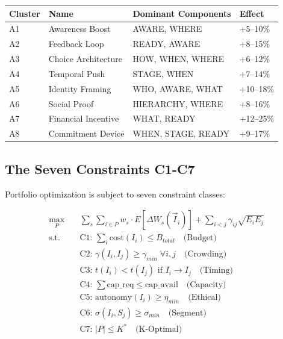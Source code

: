 \begin{center}
\renewcommand{\arraystretch}{1.1}
\small
\begin{tabular}{@{}llll@{}}
\toprule
\textbf{Cluster} & \textbf{Name} & \textbf{Dominant Components} & \textbf{Effect} \\
\midrule
A1 & Awareness Boost & AWARE, WHERE & +5--10\% \\
A2 & Feedback Loop & READY, AWARE & +8--15\% \\
A3 & Choice Architecture & HOW, WHEN, WHERE & +6--12\% \\
A4 & Temporal Push & STAGE, WHEN & +7--14\% \\
A5 & Identity Framing & WHO, AWARE, WHAT & +10--18\% \\
A6 & Social Proof & HIERARCHY, WHERE & +8--16\% \\
A7 & Financial Incentive & WHAT, READY & +12--25\% \\
A8 & Commitment Device & WHEN, STAGE, READY & +9--17\% \\
\bottomrule
\end{tabular}
\end{center}

\subsection{The Seven Constraints C1-C7}

Portfolio optimization is subject to seven constraint classes:

\begin{equation}
\boxed{
\begin{aligned}
\max_{P} \quad & \sum_{s} \sum_{i \in P} w_s \cdot E[\Delta W_s(\vec{I}_i)] + \sum_{i<j} \gamma_{ij} \sqrt{E_i E_j} \\
\text{s.t.} \quad
& \text{C1: } \sum_i \text{cost}(I_i) \leq B_{total} \quad \text{(Budget)} \\
& \text{C2: } \gamma(I_i, I_j) \geq \gamma_{min} \; \forall i,j \quad \text{(Crowding)} \\
& \text{C3: } t(I_i) < t(I_j) \text{ if } I_i \to I_j \quad \text{(Timing)} \\
& \text{C4: } \sum \text{cap\_req} \leq \text{cap\_avail} \quad \text{(Capacity)} \\
& \text{C5: } \text{autonomy}(I_i) \geq \eta_{min} \quad \text{(Ethical)} \\
& \text{C6: } \sigma(I_i, S_j) \geq \sigma_{min} \quad \text{(Segment)} \\
& \text{C7: } |P| \leq K^* \quad \text{(K-Optimal)}
\end{aligned}
}
\label{eq:mp-portfolio-constraints}
\end{equation}

